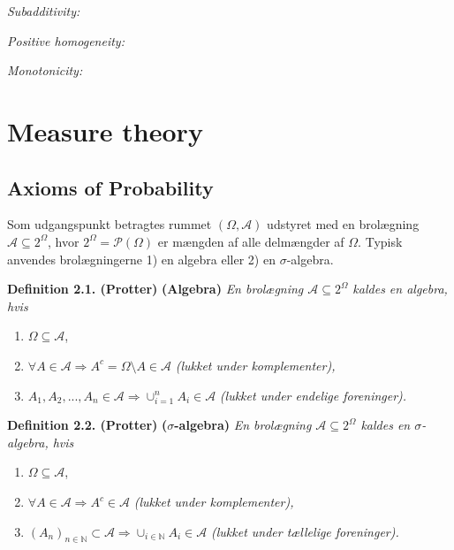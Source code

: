 \documentclass[
]{book}
\providecommand{\tightlist}{%
  \setlength{\itemsep}{0pt}\setlength{\parskip}{0pt}}
\begin{document}
\emph{Subadditivity:}

\emph{Positive homogeneity:}

\emph{Monotonicity:}

\hypertarget{measure-theory}{%
\chapter{Measure theory}\label{measure-theory}}

\hypertarget{axioms-of-probability}{%
\section{Axioms of Probability}\label{axioms-of-probability}}

Som udgangspunkt betragtes rummet \((\Omega,\mathcal{A})\) udstyret med en brolægning \(\mathcal{A}\subseteq 2^\Omega\), hvor \(2^\Omega=\mathcal{P}(\Omega)\) er mængden af alle delmængder af \(\Omega\). Typisk anvendes brolægningerne 1) en algebra eller 2) en \(\sigma\)-algebra.

\textbf{Definition 2.1. (Protter)} \textbf{(Algebra)} \emph{En brolægning \(\mathcal{A}\subseteq 2^\Omega\) kaldes en algebra, hvis}

\begin{enumerate}
\def\labelenumi{\arabic{enumi}.}
\tightlist
\item
  \(\Omega\subseteq\mathcal{A}\),
\item
  \(\forall A\in\mathcal{A} \Rightarrow A^c=\Omega\setminus A\in\mathcal{A}\) \emph{(lukket under komplementer),}
\item
  \(A_1,A_2,...,A_n\in\mathcal{A}\Rightarrow \cup_{i=1}^n A_i\in\mathcal{A}\) \emph{(lukket under endelige foreninger).}
\end{enumerate}

\textbf{Definition 2.2. (Protter)} \textbf{(\(\mathit{\sigma}\)-algebra)} \emph{En brolægning \(\mathcal{A}\subseteq 2^\Omega\) kaldes en \(\sigma\)-algebra, hvis}

\begin{enumerate}
\def\labelenumi{\arabic{enumi}.}
\tightlist
\item
  \(\Omega\subseteq\mathcal{A}\),
\item
  \(\forall A\in\mathcal{A} \Rightarrow A^c\in\mathcal{A}\) \emph{(lukket under komplementer),}
\item
  \((A_n)_{n\in\mathbb{N}}\subset\mathcal{A}\Rightarrow \cup_{i\in\mathbb{N}} A_i\in\mathcal{A}\) \emph{(lukket under tællelige foreninger).}
\end{enumerate}
\end{document}
